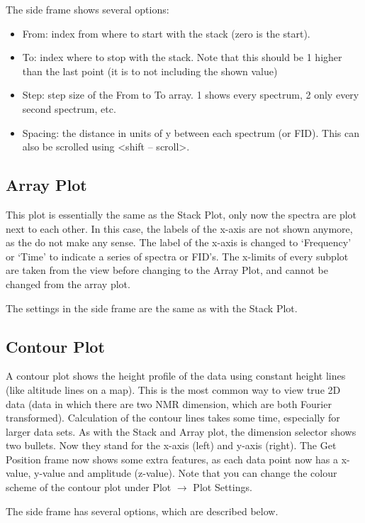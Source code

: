 \documentclass[11pt,a4paper]{article}
\begin{document}
The side frame shows several options:
\begin{itemize}
  \item From: index from where to start with the stack (zero is the start).
  \item To: index where to stop with the stack. Note that this should be 1 higher than the last point (it is to not including the shown value)
  \item Step: step size of the From to To array. 1 shows every spectrum, 2 only every second spectrum, etc.
  \item Spacing: the distance in units of y between each spectrum (or FID). This can also be scrolled using <shift -- scroll>.
\end{itemize}

\subsection{Array Plot}
This plot is essentially the same as the Stack Plot, only now the spectra are plot next to each other. In this case, the labels of the x-axis are
not shown anymore, as the do not make any sense. The label of the x-axis is changed to `Frequency' or `Time' to indicate a series of spectra or FID's.
The x-limits of every subplot are taken from the view before changing to the Array Plot, and cannot be changed from the array plot.

The settings in the side frame are the same as with the Stack Plot.


\subsection{Contour Plot}
A contour plot shows the height profile of the data using constant height lines (like altitude lines on a
map). This is the most common way to view true 2D data (data in which there are two NMR dimension, which are
both Fourier transformed). Calculation of the contour lines takes some time, especially for larger data sets.
As with the Stack and Array plot, the dimension selector shows two bullets. Now they stand for the x-axis
(left) and y-axis (right). The Get Position frame now shows some extra features, as each data point now has a
x-value, y-value and amplitude (z-value). Note that you can change the colour scheme of the contour plot under
Plot $\rightarrow$ Plot Settings.

The side frame has several options, which are described below.
\end{document}
